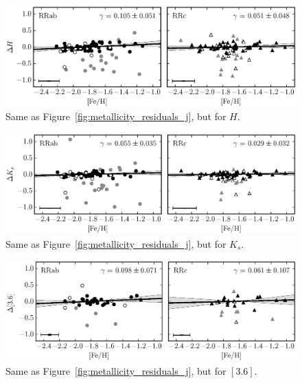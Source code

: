 \documentclass[a4paper,fleqn,usenatbib]{mnras}
\begin{document}
\begin{figure}
\begin{center}
\includegraphics[width=160mm]{../ocen_only_fitting/final_plots/metallicity_vs_residuals_H_sigclip.eps}
\caption{Same as Figure~\ref{fig:metallicity_residuals_j}, but for $H$.}
\label{fig:metallicity_residuals_h}
\end{center}
\end{figure}

\begin{figure}
\begin{center}
\includegraphics[width=160mm]{../ocen_only_fitting/final_plots/metallicity_vs_residuals_K_sigclip.eps}
\caption{Same as Figure~\ref{fig:metallicity_residuals_j}, but for $K_s$.}
\label{fig:metallicity_residuals_k}
\end{center}
\end{figure}

\begin{figure}
\begin{center}
\includegraphics[width=160mm]{../ocen_only_fitting/final_plots/metallicity_vs_residuals_3_sigclip.eps}
\caption{Same as Figure~\ref{fig:metallicity_residuals_j}, but for $[3.6]$.}
\label{fig:metallicity_residuals_3}
\end{center}
\end{figure}
\end{document}

